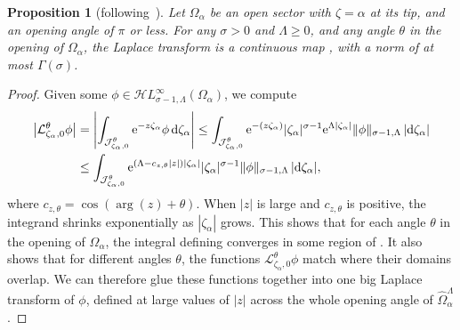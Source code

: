 \documentclass[pdftex]{sigma}
\let\Re\relax
\DeclareMathOperator{\Re}{Re}
\newcommand{\singexp}[2]{\mathcal{H}L^\infty_{#1, #2}}
\newcommand{\dualsingexp}[1]{\widehat{\mathcal{H}}L^\infty_{#1}}
\newcommand{\laplace}{\mathcal{L}}
\numberwithin{equation}{section}
\newtheorem{Proposition}[Theorem]{Proposition}
 { \theoremstyle{definition}
\newtheorem{Definition}[Theorem]{Definition}
\newtheorem{Remark}[Theorem]{Remark}
\newtheorem*{notation*}{Notation}
}
\begin{document}
\begin{Proposition}[following~\cite{sternin1995borel}]\label{prop:laplace-cont}
Let $\Omega_\alpha$ be an open sector with $\zeta = \alpha$ at its tip, and an opening angle of $\pi$ or less. For any $\sigma > 0$ and $\Lambda \ge 0$, and any angle $\theta$ in the opening of $\Omega_\alpha$, the Laplace transform \smash{$\laplace_{\zeta_\alpha, 0}^\theta$} is a continuous map \smash{$\singexp{\sigma-1}{\Lambda}(\Omega_\alpha) \to \dualsingexp{-\sigma}\bigl(\widehat{\Omega}_\alpha^\Lambda\bigr)$}, with a norm of at most $\Gamma(\sigma)$.
\end{Proposition}
\begin{proof}
Given some $\phi \in \singexp{\sigma-1}{\Lambda}(\Omega_\alpha)$, we compute
\begin{align*}
\big|\laplace_{\zeta_\alpha, 0}^\theta \phi\big| & = \left| \int_{\mathcal{J}_{\zeta_\alpha, 0}^\theta} {\rm e}^{-z\zeta_\alpha} \phi\, {\rm d}\zeta_\alpha \right| \le \int_{\mathcal{J}_{\zeta_\alpha,0}^\theta} {\rm e}^{-\Re(z\zeta_\alpha)} |\zeta_\alpha|^{\sigma-1} {\rm e}^{\Lambda |\zeta_\alpha|} \|\phi\|_{\sigma-1, \Lambda} \,|{\rm d}\zeta_\alpha| \\
& \le \int_{\mathcal{J}_{\zeta_\alpha,0}^\theta} {\rm e}^{(\Lambda - c_{z, \theta}|z|)|\zeta_\alpha|} |\zeta_\alpha|^{\sigma-1} \|\phi\|_{\sigma-1, \Lambda} \,|{\rm d}\zeta_\alpha|,
\end{align*}
where $c_{z, \theta} = \cos(\arg(z) + \theta)$. When $|z|$ is large and $c_{z, \theta}$ is positive, the integrand shrinks exponentially as $|\zeta_\alpha|$ grows. This shows that for each angle $\theta$ in the opening of $\Omega_\alpha$, the integral defining \smash{$\laplace_{\zeta_\alpha, 0}^\theta \phi$} converges in some region of \smash{$\widehat{\Omega}_\alpha^\Lambda$}. It also shows that for different angles $\theta$, the functions $\laplace_{\zeta_\alpha, 0}^\theta \phi$ match where their domains overlap. We can therefore glue these functions together into one big Laplace transform of $\phi$, defined at large values of $|z|$ across the whole opening angle of $\widehat{\Omega}_\alpha^\Lambda$.


\end{proof}
\end{document}
